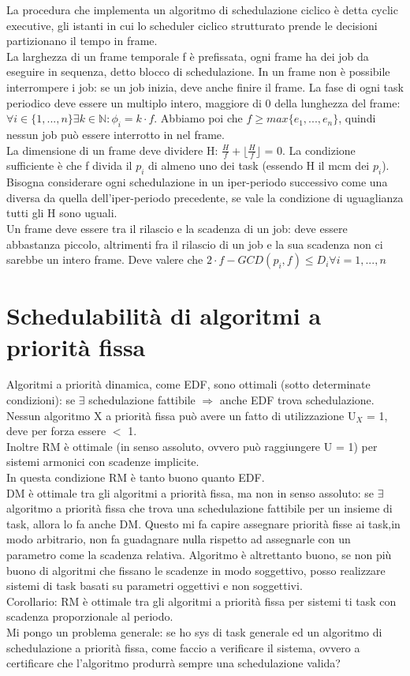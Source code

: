 \documentclass[12pt, oneside]{extbook}
\begin{document}
La procedura che implementa un algoritmo di schedulazione ciclico è detta cyclic executive, gli istanti in cui lo scheduler ciclico strutturato prende le decisioni partizionano il tempo in frame.\\ La larghezza di un frame temporale f è prefissata, ogni frame ha dei job da eseguire in sequenza, detto blocco di schedulazione. In un frame non è possibile interrompere i job: se un job inizia, deve anche finire il frame. La fase di ogni task periodico deve essere un multiplo intero, maggiore di 0 della lunghezza del frame: $\forall i \in \{1,...,n\} \exists k \in \mathbb{N}: \phi_i = k\cdot f$. Abbiamo poi che $f \geq max\{e_1,...,e_n\}$, quindi nessun job può essere interrotto in nel frame.\\ La dimensione di un frame deve dividere H: $\frac{H}{f} + \lfloor \frac{H}{f} \rfloor$ = 0. La condizione sufficiente è che f divida il $p_i$ di almeno uno dei task (essendo H il mcm dei $p_i$). Bisogna considerare ogni schedulazione in un iper-periodo successivo come una diversa da quella dell'iper-periodo precedente, se vale la condizione di uguaglianza tutti gli H sono uguali.\\ Un frame deve essere tra il rilascio e la scadenza di un job: deve essere abbastanza piccolo, altrimenti fra il rilascio di un job e la sua scadenza non ci sarebbe un intero frame. Deve valere che $2\cdot f - GCD(p_i, f) \leq D_i \forall i = 1,...,n$
\section{Schedulabilità di algoritmi a priorità fissa}
Algoritmi a priorità dinamica, come EDF, sono ottimali (sotto determinate condizioni): se $\exists$ schedulazione fattibile $\Rightarrow$ anche EDF trova schedulazione.\\ Nessun algoritmo X a priorità fissa può avere un fatto di utilizzazione U$_{X}$ = 1, deve per forza essere $<$ 1.\\ Inoltre RM è ottimale (in senso assoluto, ovvero può raggiungere U = 1) per sistemi armonici con scadenze implicite.\\ In questa condizione RM è tanto buono quanto EDF.\\ DM è ottimale tra gli algoritmi a priorità fissa, ma non in senso assoluto: se $\exists$ algoritmo a priorità fissa che trova una schedulazione fattibile per un insieme di task, allora lo fa anche DM. Questo mi fa capire assegnare priorità fisse ai task,in modo arbitrario, non fa guadagnare nulla rispetto ad assegnarle con un parametro come la scadenza relativa. Algoritmo è altrettanto buono, se non più buono di algoritmi che fissano le scadenze in modo soggettivo, posso realizzare sistemi di task basati su parametri oggettivi e non soggettivi.\\ Corollario: RM è ottimale tra gli algoritmi a priorità fissa per sistemi ti task con scadenza proporzionale al periodo.\\ Mi pongo un problema generale: se ho sys di task generale ed un algoritmo di schedulazione a priorità fissa, come faccio a verificare il sistema, ovvero a certificare che l'algoritmo produrrà sempre una schedulazione valida?
\end{document}
